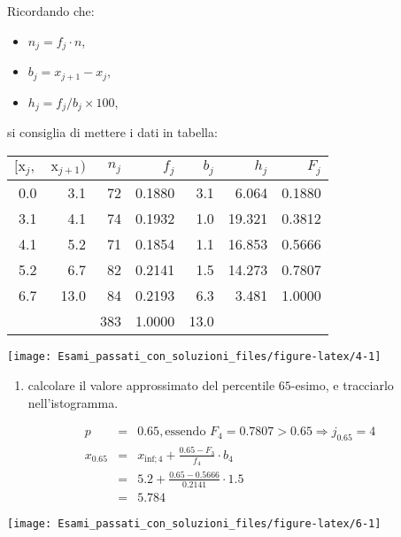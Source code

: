 \documentclass[
  11pt,
]{book}
\providecommand{\tightlist}{%
  \setlength{\itemsep}{0pt}\setlength{\parskip}{0pt}}
\theoremstyle{mytheoremstyle}
\theoremstyle{mydefstyle}
\newenvironment{sol}
  {
  \begin{tcolorbox}[enhanced,breakable,arc=0.1mm,boxrule=1pt,colback=white,colframe=iblue,
  title=\bf \fontfamily{lmss}\selectfont \hspace{.5 cm} Soluzione,drop fuzzy shadow]

}{
\end{tcolorbox}
  }
\begin{document}
\begin{sol}

Ricordando che:

\begin{itemize}
\tightlist
\item
  \(n_j=f_j\cdot n\),
\item
  \(b_j=x_{j+1}-x_{j}\),
\item
  \(h_j=f_j/b_j\times 100\),
\end{itemize}

si consiglia di mettere i dati in tabella:

\begin{table}[H]
\centering
\begin{tabular}{rrrrrrr}
\toprule
$[\text{x}_j,$ & $\text{x}_{j+1})$ & $n_j$ & $f_j$ & $b_j$ & $h_j$ & $F_j$\\
\midrule
0.0 & 3.1 & 72 & 0.1880 & 3.1 & 6.064 & 0.1880\\
3.1 & 4.1 & 74 & 0.1932 & 1.0 & 19.321 & 0.3812\\
4.1 & 5.2 & 71 & 0.1854 & 1.1 & 16.853 & 0.5666\\
5.2 & 6.7 & 82 & 0.2141 & 1.5 & 14.273 & 0.7807\\
6.7 & 13.0 & 84 & 0.2193 & 6.3 & 3.481 & 1.0000\\
 &  & 383 & 1.0000 & 13.0 &  & \\
\bottomrule
\end{tabular}
\end{table}

\begin{center}\texttt{[image: Esami\_passati\_con\_soluzioni\_files/figure-latex/4-1]} \end{center}

\end{sol}

\begin{enumerate}
\def\labelenumi{\alph{enumi}.}
\setcounter{enumi}{1}
\tightlist
\item
  calcolare il valore approssimato del percentile \(65\)-esimo, e tracciarlo nell'istogramma.
\end{enumerate}

\begin{sol}

\begin{eqnarray*}
  p &=&  0.65 , \text{essendo }F_{ 4 }= 0.7807  > 0.65  \Rightarrow j_{ 0.65 }= 4 \\
  x_{ 0.65 } &=& x_{\text{inf}; 4 } + \frac{ { 0.65 } - F_{ 3 }} {f_{ 4 }} \cdot b_{ 4 } \\
            &=&  5.2  + \frac {{ 0.65 } -  0.5666 } { 0.2141 } \cdot  1.5  \\
            &=&  5.784 
\end{eqnarray*}

\begin{center}\texttt{[image: Esami\_passati\_con\_soluzioni\_files/figure-latex/6-1]} \end{center}

\end{sol}
\end{document}
